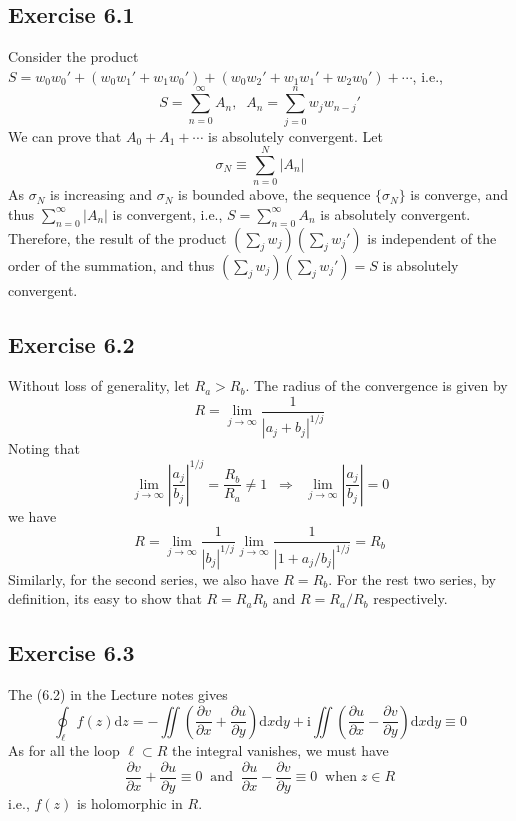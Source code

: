 \documentclass[]{ctexart}
\begin{document}
	\subsection{Exercise 6.1}
	Consider the product $S=w_0w_0'+(w_0w_1'+w_1w_0')+(w_0w_2'+w_1w_1'+w_2w_0')+\cdots$, i.e., 
	\begin{equation*}
	S=\sum_{n=0}^\infty A_n,\;\;A_n=\sum_{j=0}^nw_jw_{n-j}'
	\end{equation*}
	We can prove that $A_0+A_1+\cdots$ is absolutely convergent. Let 
	\begin{equation*}
	\sigma_N\equiv\sum_{n=0}^N|A_n|
	\end{equation*}
	As $\sigma_N$ is increasing and $\sigma_N$ is bounded above, the sequence $\{\sigma_N\}$ is converge, and thus $\sum_{n=0}^\infty|A_n|$ is convergent, i.e., 
	$S=\sum_{n=0}^\infty A_n$ is absolutely convergent. Therefore, the result of the product $(\sum_jw_j)(\sum_jw_j')$ is independent of the order of the summation, and 
	thus $(\sum_jw_j)(\sum_jw_j')=S$ is absolutely convergent. 
	\subsection{Exercise 6.2}
	Without loss of generality, let $R_a>R_b$. The radius of the convergence is given by 
	\begin{equation*}
	R=\lim_{j\to\infty}\frac{1}{|a_j+b_j|^{1/j}}
	\end{equation*}
	Noting that 
	\begin{equation*}
	\lim_{j\to\infty}\left|\frac{a_j}{b_j}\right|^{1/j}=\frac{R_b}{R_a}\ne 1\;\;\Rightarrow\;\;\lim_{j\to\infty}\left|\frac{a_j}{b_j}\right|=0
	\end{equation*}
	we have 
	\begin{equation*}
	R=\lim_{j\to\infty}\frac{1}{|b_j|^{1/j}}\lim_{j\to\infty}\frac{1}{|1+a_j/b_j|^{1/j}}=R_b
	\end{equation*}
	Similarly, for the second series, we also have $R=R_b$. For the rest two series, by definition, its easy to show that $R=R_aR_b$ and $R=R_a/R_b$ respectively. 
	\subsection{Exercise 6.3}
	The (6.2) in the Lecture notes gives 
	\begin{equation*}
	\oint_\ell f(z)\mathrm{d}z=-\iint\left(\frac{\partial v}{\partial x}+\frac{\partial u}{\partial y}\right)\mathrm{d}x\mathrm{d}y+\mathrm{i}\iint\left(\frac{\partial u}{\partial x}-\frac{\partial v}{\partial y}\right)\mathrm{d}x\mathrm{d}y\equiv 0
	\end{equation*}
	As for all the loop $\ell\subset R$ the integral vanishes, we must have 
	\begin{equation*}
	\frac{\partial v}{\partial x}+\frac{\partial u}{\partial y}\equiv 0\;\;\text{and}\;\;\frac{\partial u}{\partial x}-\frac{\partial v}{\partial y}\equiv 0\;\;\text{when}\;z\in R
	\end{equation*}
	i.e., $f(z)$ is holomorphic in $R$. 
\end{document}
